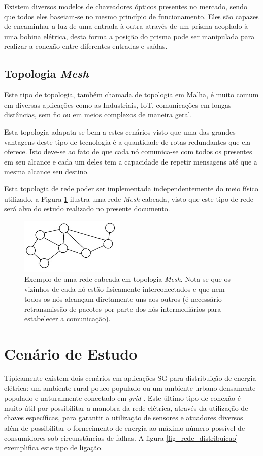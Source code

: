 \documentclass[12pt]{article}
\begin{document}
Existem diversos modelos de chaveadores ópticos presentes no mercado, sendo que todos eles baseiam-se no mesmo princípio de funcionamento. Eles são capazes de encaminhar a luz de uma entrada à outra através de um prisma acoplado à uma bobina elétrica, desta forma a posição do prisma pode ser manipulada para realizar a conexão entre diferentes entradas e saídas.

\subsection{Topologia \emph{Mesh}}
Este tipo de topologia, também chamada de topologia em Malha, é muito comum em diversas aplicações como as Industriais, IoT, comunicações em longas distâncias, sem fio ou em meios complexos de maneira geral. 

Esta topologia adapata-se bem a estes cenários visto que uma das grandes vantagens deste tipo de tecnologia é a quantidade de rotas redundantes que ela oferece. Isto deve-se ao fato de que cada nó comunica-se com todos os presentes em seu alcance e cada um deles tem a capacidade de repetir mensagens até que a mesma alcance seu destino. 

Esta topologia de rede poder ser implementada independentemente do meio físico utilizado, a Figura \ref{fig_rede_mesh} ilustra uma rede \emph{Mesh} cabeada, visto que este tipo de rede será alvo do estudo realizado no presente documento.

\begin{figure} %
	\centering
	\includegraphics[width=5cm]{Rede_Mesh}
	\caption{Exemplo de uma rede cabeada em topologia \emph{Mesh}. Nota-se que os vizinhos de cada nó estão fisicamente interconectados e que nem todos os nós alcançam diretamente uns aos outros (é necessário retransmissão de pacotes por parte dos nós intermediários para estabelecer a comunicação).}
	\label{fig_rede_mesh}
\end{figure}

\section{Cenário de Estudo}
\label{sec:Ambientacao}
Tipicamente existem dois cenários em aplicações SG para distribuição de energia elétrica: um ambiente rural pouco populado ou um ambiente urbano densamente populado e naturalmente conectado em \emph{grid} \cite{Conf_Sood2009}. Este último tipo de conexão é muito útil por possibilitar a manobra da rede elétrica, através da utilização de chaves específicas, para garantir a utilização de sensores e atuadores diversos além de possibilitar o fornecimento de energia ao máximo número possível de consumidores sob circunstâncias de falhas. A figura \ref{fig_rede_distribuicao} exemplifica este tipo de ligação.
\end{document}
